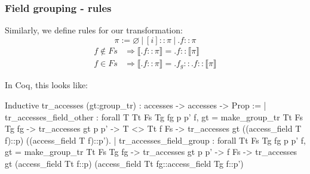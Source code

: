 \begin{frame}[fragile]
\frametitle{Field grouping - rules}

Similarly, we define rules for our transformation:
\[
	\pi := \varnothing \: | \: [i]::\pi \: | \: .f::\pi
\] 
\begin{align*}
	f \notin Fs & \Rightarrow \llbracket .f::\pi \rrbracket = .f:: \llbracket \pi \rrbracket \\
	f \in Fs    & \Rightarrow \llbracket .f::\pi \rrbracket = .f_g::.f:: \llbracket \pi \rrbracket 
\end{align*}


\bigskip

In Coq, this looks like:

\begin{coqs}
Inductive tr_accesses (gt:group_tr) : accesses -> accesses -> Prop :=
  | tr_accesses_field_other : forall T Tt Fs Tg fg p p' f,
      gt = make_group_tr Tt Fs Tg fg ->
      tr_accesses gt p p' ->
      T <> Tt \/ f \notin Fs ->
      tr_accesses gt ((access_field T f)::p) ((access_field T f)::p').  
  | tr_accesses_field_group : forall Tt Fs Tg fg p p' f,
      gt = make_group_tr Tt Fs Tg fg ->
      tr_accesses gt p p' ->
      f \in Fs ->
      tr_accesses gt (access_field Tt f::p) (access_field Tt fg::access_field Tg f::p')
\end{coqs}

\end{frame}


